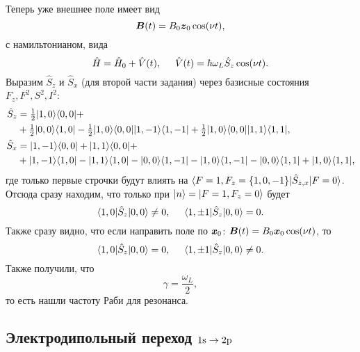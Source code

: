 Теперь уже внешнее поле имеет вид
\begin{equation*}
    \mbox{\boldmath $B$}(t) = B_0 \mbox{\boldmath $z$}_0 \cos(\nu t),
\end{equation*}
с намильтонианом, вида
\begin{equation*}
    \hat{H} = \hat{H}_0  + \hat{V}(t),
    \hspace{5 mm} 
    \hat{V}(t) = \hbar \omega_L \hat{S}_z \cos (\nu t).
\end{equation*}
Выразим $\hat{S}_z$ и $\hat{S}_x$ (для второй части задания) через базисные состояния $F_z, F^2, S^2, I^2$:
\begin{align*}
    \hat{S}_z &= \tfrac{1}{2}| 1,0 \rangle\langle 0,0 | + \\ 
    &+\tfrac{1}{2} | 0,0 \rangle\langle 1,0 | - \tfrac{1}{2}| 1,0 \rangle\langle 0,0 || 1,-1 \rangle\langle 1,-1 |  + \tfrac{1}{2}| 1,0 \rangle\langle 0,0 || 1,1 \rangle\langle 1,1 |
    , \\ 
    \hat{S}_x &= | 1,-1 \rangle\langle 0,0 | + | 1,1 \rangle\langle 0,0 | + \\
    &+ | 1,-1 \rangle\langle 1,0 | - | 1,1 \rangle\langle 1,0 | - | 0,0 \rangle\langle 1,-1 | - | 1,0 \rangle\langle 1,-1 | - | 0,0 \rangle\langle 1,1 | + | 1,0 \rangle\langle 1,1 |,
\end{align*}
где только первые строчки будут влиять на $\bk{F=1, F_z=\{1,0,-1\}}[\hat{S}_{z, x}]{F=0}$. Отсюда сразу находим, что только при $\left| n \right\rangle = \left| F=1, F_z=0 \right\rangle$ будет
\begin{equation*}
    \bk{1, 0}[\hat{S}_z]{0,0} \neq 0,
    \hspace{5 mm} 
    \bk{1, \pm 1}[\hat{S}_z]{0,0} = 0.
\end{equation*}
Также сразу видно, что если направить поле по $\mbox{\boldmath $x$}_0$: $\mbox{\boldmath $B$}(t) = B_0 \mbox{\boldmath $x$}_0 \cos (\nu t)$, то
\begin{equation*}
    \bk{1, 0}[\hat{S}_z]{0,0} = 0,
    \hspace{5 mm} 
    \bk{1, \pm 1}[\hat{S}_z]{0,0} \neq 0.
\end{equation*}
Также получили, что
\begin{equation*}
    \gamma = \frac{\omega_L}{2},
\end{equation*}
то есть нашли частоту Раби для резонанса. 


\setcounter{subsection}{2}
\subsection{Электродипольный переход \texorpdfstring{$1\textnormal{s}\to 2\textnormal{p}$}{1s -> 2p}}



